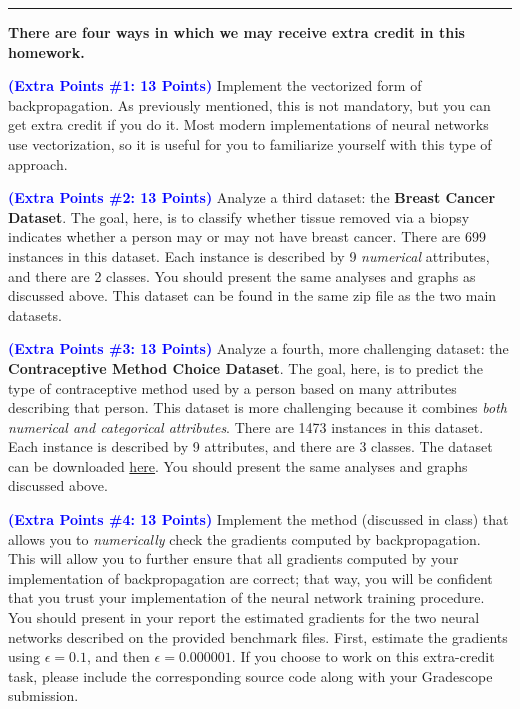 \documentclass[letterpaper]{article}
\newcommand{\HIGHLIGHT}[1]{\textcolor{blue}{\textbf{#1}}}
\begin{document}
\vspace{1cm}
\noindent\rule{\textwidth}{1pt}

\textbf{There are four ways in which we may receive extra credit in this homework.}

\noindent \HIGHLIGHT{(Extra Points \#1: 13 Points)} 
Implement the vectorized form of backpropagation. As previously mentioned, this is not mandatory, but you can get extra credit if you do it. Most modern implementations of neural networks use vectorization, so it is useful for you to familiarize yourself with this type of approach. 

\noindent \HIGHLIGHT{(Extra Points \#2: 13 Points)} 
Analyze a third dataset: the \textbf{Breast Cancer Dataset}. The goal, here, is to classify whether tissue removed via a biopsy indicates whether a person may or may not have breast cancer. There are 699 instances in this dataset. Each instance is described by 9 \textit{numerical} attributes, and there are 2 classes. You should present the same analyses and graphs as discussed above. This dataset can be found in the same zip file as the two main datasets.

\noindent \HIGHLIGHT{(Extra Points \#3: 13 Points)}    
Analyze a fourth, more challenging dataset: the \textbf{Contraceptive Method Choice Dataset}. The goal, here, is to predict the type of contraceptive method used by a person based on many attributes describing that person. This dataset is more challenging because it combines \textit{both numerical and categorical attributes}. There are 1473 instances in this dataset. Each instance is described by 9 attributes, and there are 3 classes. The dataset can be downloaded \href{https://archive.ics.uci.edu/ml/datasets/Contraceptive+Method+Choice}{here}. You should present the same analyses and graphs discussed above.

\noindent \HIGHLIGHT{(Extra Points \#4: 13 Points)}
Implement the method (discussed in class) that allows you to \textit{numerically} check the gradients computed by backpropagation. This will allow you to further ensure that all gradients computed by your implementation of backpropagation are correct; that way, you will be confident that you trust your implementation of the neural network training procedure. You should present in your report the estimated gradients for the two neural networks described on the provided benchmark files. First, estimate the gradients using $\epsilon=0.1$, and then $\epsilon=0.000001$. If you choose to work on this extra-credit task, please include the corresponding source code along with your Gradescope submission.
\end{document}
